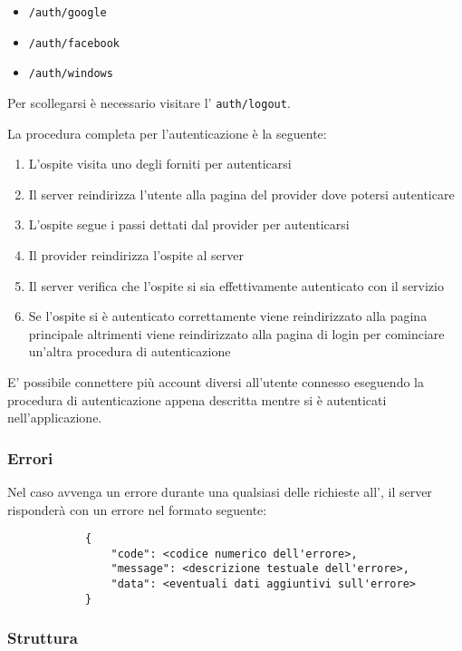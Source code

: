 \documentclass[12pt,a4paper]{article}
\begin{document}
			\begin{itemize}
			    \item \texttt{/auth/google}
			    \item \texttt{/auth/facebook}
			    \item \texttt{/auth/windows}
			\end{itemize}

			Per scollegarsi è necessario visitare l' \texttt{auth/logout}.

			La procedura completa per l'autenticazione è la seguente:

			\begin{enumerate}
			    \item L'ospite visita uno degli  forniti per autenticarsi
			    \item Il server reindirizza l'utente alla pagina del provider dove potersi autenticare
			    \item L'ospite segue i passi dettati dal provider per autenticarsi
			    \item Il provider reindirizza l'ospite al server
			    \item Il server verifica che l'ospite si sia effettivamente autenticato con il servizio
			    \item Se l'ospite si è autenticato correttamente viene reindirizzato alla pagina principale
			        altrimenti viene reindirizzato alla pagina di login per cominciare un'altra procedura di
			        autenticazione
			\end{enumerate}

			E' possibile connettere più account diversi all'utente connesso eseguendo la procedura
			di autenticazione appena descritta mentre si è autenticati nell'applicazione.

		\subsubsection{Errori}

			Nel caso avvenga un errore durante una qualsiasi delle richieste all', il server risponderà
			con un errore nel formato  seguente:

			\begin{lstlisting}
			{
			    "code": <codice numerico dell'errore>,
			    "message": <descrizione testuale dell'errore>,
			    "data": <eventuali dati aggiuntivi sull'errore>
			}
			\end{lstlisting}

		\subsubsection{Struttura}
\end{document}
